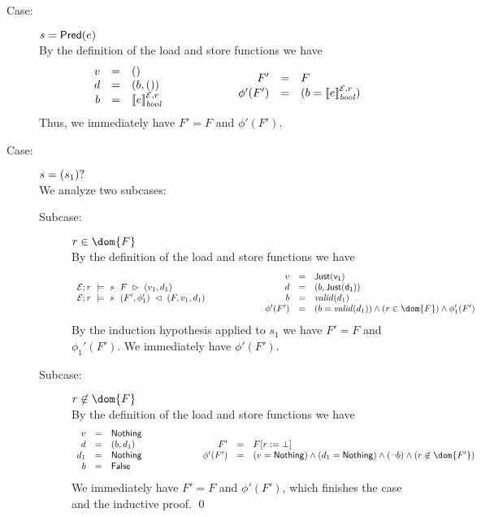 {\begin{description}
\item[Case:] $s = \mathsf{Pred}(e)$\\[1ex]
%
By the definition of the load and store functions we have
\[
\begin{array}{rcl}
v &=& ()\\
d &=& (b,())\\
b &=& [\![e]\!]^{\mathcal{E},r}_{\mathit{bool}}\\
\end{array}\hspace*{2cm}\begin{array}{rcl}
F' &=& F\\
\phi'(F') &=& (b = [\![e]\!]^{\mathcal{E},r}_{\mathit{bool}})\\
\end{array}
\]
Thus, we immediately have $F' = F$ and $\phi'(F')$.

\item[Case:] $s = (s_1)?$\\[1ex]
%
We analyze two subcases:
\begin{description}
\item[Subcase:] $r \in \dom{F}$\\[1ex]
%
By the definition of the load and store functions we have
\[ 
\begin{array}{l}
\load{\Env}{F}{r}{s}{v_1,d_1}\\
\store{\Env}{F}{r}{v_1,d_1}{s}{ F',\phi_1' }\\
\end{array}\hspace*{2cm}\begin{array}{rcl}
v &=& \Just{v_1}\\
d &=& (b,\Just{d_1})\\
b &=& \valid{d_1}\\
\phi'(F') &=& (b = \valid{d_1}) \wedge (r \in \dom{F}) \wedge \phi_1'(F')\\
\end{array}
\]
%
By the induction hypothesis applied to $s_1$ we have $F' = F$ and
$\phi_1'(F')$. We immediately have $\phi'(F')$.

\item[Subcase:] $r \not\in \dom{F}$\\[1ex]
%
By the definition of the load and store functions we have 
\[ 
\begin{array}{rcl}
v &=& \Nothing\\
d &=& (b,d_1)\\
d_1 &=& \Nothing\\
b &=& \False\\
\end{array}\hspace*{2cm}\begin{array}{rcl}
F' &=& \FDelete{F}{r}\\
\phi'(F') &=& (v = \Nothing) \wedge (d_1 = \Nothing) \wedge (\neg b) \wedge  (r \not\in \dom{F'})
\end{array}
\]
We immediately have $F' = F$ and $\phi'(F')$, which finishes the case
and the inductive proof. \hfill \qed
\end{description}
\end{description}
}

